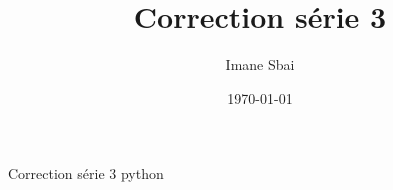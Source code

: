 \documentclass{article}
\title{Correction série 3}
\author{Imane Sbai}
\date {\today}
\begin{document}
\begin{titlepage}
    \begin{center}
Correction série 3 python
    \end{center}
\end{titlepage}
\end{document}
